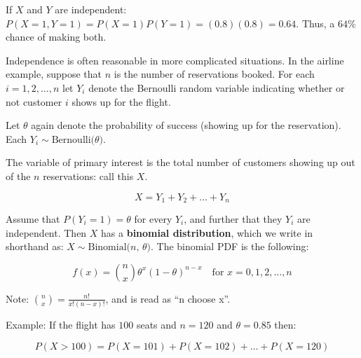 \documentclass[11pt]{article}
\begin{document}
\vspace{2mm}

If $X$ and $Y$ are independent: $P(X=1, Y=1) = P(X=1)P(Y=1) = (0.8) ( 0.8) = 0.64$. Thus, a $64\%$
chance of making both.

\vspace{2mm}

Independence is often reasonable in more complicated situations. In the airline example, suppose that 
$n$ is the number of reservations booked. For each $i = 1, 2, \ldots, n$ let $Y_{i}$ denote the Bernoulli
random variable indicating whether or not customer $i$ shows up for the flight. 

\vspace{2mm}

Let $\theta$ again denote the probability of success (showing up for the reservation). 
Each $Y_{i} \sim \mbox{Bernoulli($\theta$)}$.

\vspace{2mm}

The variable of primary interest is the total number of customers showing up out of the $n$ reservations: 
call this $X$.

\begin{equation*}
X = Y_{1} + Y_{2} + \ldots + Y_{n}
\end{equation*}

\vspace{2mm} 

Assume that $P(Y_{i} = 1) = \theta$ for every $Y_{i}$, and further that they $Y_{i}$ are independent.
Then $X$ has a \textbf{binomial distribution}, which we write in shorthand as: $X \sim \mbox{Binomial($n$, $\theta$)}$.
The binomial PDF is the following:

\begin{equation*}
f(x) = {n \choose x} \theta^{x} (1-\theta)^{n-x} \quad \mbox{for $x = 0, 1, 2, \ldots, n$}
\end{equation*}

\vspace{2mm}

Note: ${n \choose x} = \frac{n!}{x! (n-x)!}$, and is read as ``n choose x''.

\vspace{2mm}

Example: If the flight has $100$ seats and $n = 120$ and $\theta = 0.85$ then:

\begin{equation*}
P(X > 100) = P(X=101) + P(X=102) + \ldots + P(X=120)
\end{equation*}
\end{document}
